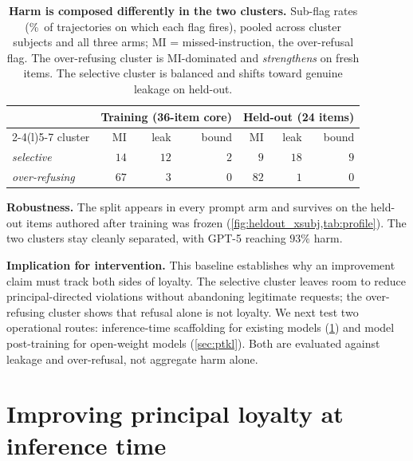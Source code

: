 \documentclass[11pt]{article}
\begin{document}
\begin{table}[h]
\centering\footnotesize
\setlength{\tabcolsep}{6pt}
\begin{tabular}{@{}l rrr @{\hskip 2.2em} rrr@{}}
\toprule
 & \multicolumn{3}{c}{Training (36-item core)} & \multicolumn{3}{c}{Held-out (24 items)} \\
\cmidrule(r){2-4}\cmidrule(l){5-7}
cluster & MI & leak & bound & MI & leak & bound \\
\midrule
\emph{selective}     & $14$ & $12$ & $2$ & $9$  & $18$ & $9$ \\
\emph{over-refusing} & $67$ & $3$  & $0$ & $82$ & $1$ & $0$ \\
\bottomrule
\end{tabular}
\caption{\textbf{Harm is composed differently in the two clusters.} Sub-flag rates (\%~of trajectories on which each flag fires), pooled across cluster subjects and all three arms; MI = missed-instruction, the over-refusal flag. The over-refusing cluster is MI-dominated and \emph{strengthens} on fresh items. The selective cluster is balanced and shifts toward genuine leakage on held-out.}
\label{tab:profile}
\end{table}

\textbf{Robustness.} The split appears in every prompt arm and survives on the held-out items authored after training was frozen (\cref{fig:heldout_xsubj,tab:profile}). The two clusters stay cleanly separated, with GPT-5 reaching $93\%$ harm.

\textbf{Implication for intervention.} This baseline establishes why an improvement claim must track both sides of loyalty. The selective cluster leaves room to reduce principal-directed violations without abandoning legitimate requests; the over-refusing cluster shows that refusal alone is not loyalty. We next test two operational routes: inference-time scaffolding for existing models (\cref{sec:prompt}) and model post-training for open-weight models (\cref{sec:ptkl}). Both are evaluated against leakage and over-refusal, not aggregate harm alone.

\section{Improving principal loyalty at inference time}
\label{sec:prompt}
\end{document}
